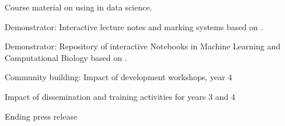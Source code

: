 \begin{workpackage}
\begin{wpdelivs}
 \begin{wpdeliv}[due=24,id=datascience-course,dissem=PU,nature=DEC,lead=USH]{Course material on using \TheProject in data science.}
   \end{wpdeliv}
 \begin{wpdeliv}[due=36,id=lecture-notes,dissem=PU,nature=DEM,lead=USH]{Demonstrator: Interactive lecture notes and marking systems based on \TheProject.}\end{wpdeliv}
 \begin{wpdeliv}[due=44,id=notebook-repo,dissem=PU,nature=DEM,lead=USH]{Demonstrator: Repository of interactive Notebooks in Machine Learning and Computational Biology based on \TheProject.}\end{wpdeliv}
 \begin{wpdeliv}[due=48,id=workshops-4,dissem=PU,nature=R,lead=PS]{Community building: Impact of development workshops, year 4}\end{wpdeliv}   
 \begin{wpdeliv}[due=48,id=dissem-2,dissem=PU,nature=R,lead=PS]{Impact of dissemination and training activities for years 3 and 4}\end{wpdeliv}  
\begin{wpdeliv}[due=48,id=press-release-2,dissem=PU,nature=DEC,lead=PS]{Ending press release}\end{wpdeliv}
\end{wpdelivs}


\end{workpackage}


